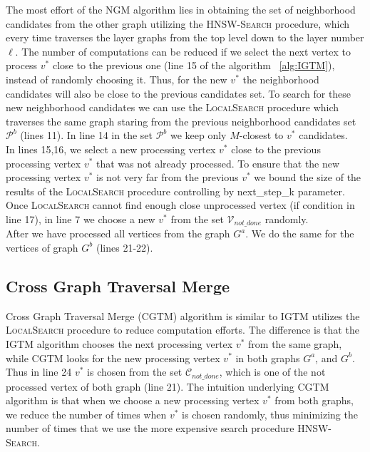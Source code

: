 \documentclass{article}
\begin{document}
The most effort of the \textsc{NGM} algorithm lies in obtaining the set of neighborhood candidates from the other graph utilizing the \textsc{HNSW-Search} procedure, which every time traverses the layer graphs from the top level down to the layer number $\ell$. The number of computations can be reduced if we select the next vertex to process $v^*$ close to the previous one (line 15 of the algorithm ~\ref{alg:IGTM}), instead of randomly choosing it. Thus, for the new $v^*$ the neighborhood candidates will also be close to the previous candidates set. To search for these new neighborhood candidates we can use the \textsc{LocalSearch} procedure which traverses the same graph staring from the previous neighborhood candidates set $\mathcal{P}^b$ (lines 11). In line 14 in the set $\mathcal{P}^b$ we keep only $M$-closest to $v^*$ candidates.\\
In lines 15,16, we select a new processing vertex $v^*$  close to the previous processing vertex $v^*$ that was not already processed.  
To ensure that the new processing vertex $v^*$ is not very far from the previous $v^*$ we bound the size of the results of the \textsc{LocalSearch} procedure controlling by next\_step\_k parameter. Once \textsc{LocalSearch} cannot find enough close unprocessed vertex (if condition in line 17), in line 7 we choose a new $v^*$ from the set $\mathcal{V}_{not\_done}$ randomly.\\
After we have processed all vertices from the graph $G^a$. We do the same for the vertices of graph $G^b$ (lines 21-22).  

\subsection{Cross Graph Traversal Merge}

Cross Graph Traversal Merge (\textsc{CGTM}) algorithm is similar to \textsc{IGTM} utilizes the \textsc{LocalSearch} procedure to reduce computation efforts. The difference is that the \textsc{IGTM} algorithm chooses the next processing vertex $v^*$ from the same graph, while \textsc{CGTM} looks for the new processing vertex $v^*$ in both graphs $G^a$, and $G^b$. 
Thus in line 24 $v^*$ is chosen from the set $\mathcal{C}_{not\_done}$, which is one of the not processed vertex of both graph (line 21). The intuition underlying \textsc{CGTM} algorithm is that when we choose a new processing vertex $v^*$ from both graphs, we reduce the number of times when $v^*$ is chosen randomly, thus minimizing the number of times that we use the more expensive search procedure \textsc{HNSW-Search}.
\end{document}
